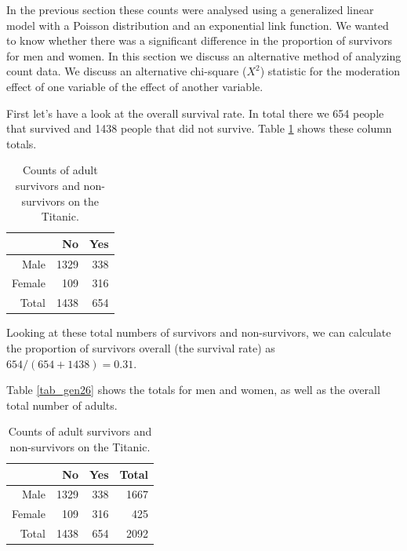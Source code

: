 \documentclass[]{book}\usepackage[]{graphicx}\usepackage[]{color}
\begin{document}
In the previous section these counts were analysed using a generalized linear model with a Poisson distribution and an exponential link function. We wanted to know whether there was a significant difference in the proportion of survivors for men and women. In this section we discuss an alternative method of analyzing count data. We discuss an alternative chi-square ($X^2$) statistic for the moderation effect of one variable of the effect of another variable.

First let's have a look at the overall survival rate. In total there we  654 people that survived and 1438 people that did not survive. Table \ref{tab:gen_25} shows these column totals.

\begin{table}[ht]
\centering
\caption{Counts of adult survivors and non-survivors on the Titanic.} 
\label{tab:gen_25}
\begin{tabular}{rrr}
  & No & Yes \\ 
  \hline
Male & 1329 & 338 \\ 
  Female & 109 & 316 \\ 
   \hline
Total & 1438 & 654 \\ 
   \hline
\end{tabular}
\end{table}


Looking at these total numbers of survivors and non-survivors, we can calculate the proportion of survivors overall (the survival rate) as $654/(654+1438)= 0.31$.

Table \ref{tab_gen26} shows the totals for men and women, as well as the overall total number of adults.


\begin{table}[ht]
\centering
\caption{Counts of adult survivors and non-survivors on the Titanic.} 
\label{tab:gen_26}
\begin{tabular}{rrrr}
  & No & Yes & Total \\ 
  \hline
Male & 1329 & 338 & 1667 \\ 
  Female & 109 & 316 & 425 \\ 
   \hline
Total & 1438 & 654 & 2092 \\ 
   \hline
\end{tabular}
\end{table}
\end{document}
